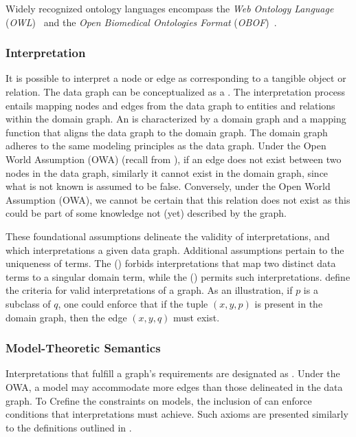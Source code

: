 Widely recognized ontology languages encompass the \textit{Web Ontology Language} (\textit{OWL})~\cite{Hitzler2014OWLPrimer} and the \textit{Open Biomedical Ontologies Format} (\textit{OBOF})~\cite{Mungall2012OBOF}.

\subsubsection{Interpretation}
It is possible to interpret a node or edge as corresponding to a tangible object or relation. The data graph can be conceptualized as a . The interpretation process entails mapping nodes and edges from the data graph to entities and relations within the domain graph. An  is characterized by a domain graph and a mapping function that aligns the data graph to the domain graph. The domain graph adheres to the same modeling principles as the data graph. Under the Open World Assumption (OWA) (recall from ), if an edge does not exist between two nodes in the data graph, similarly it cannot exist in the domain graph, since what is not known is assumed to be false. Conversely, under the Open World Assumption (OWA), we cannot be certain that this relation does not exist as this could be part of some knowledge not (yet) described by the graph. 

These foundational assumptions delineate the validity of interpretations, and which interpretations  a given data graph. Additional assumptions pertain to the uniqueness of terms. The  () forbids interpretations that map two distinct data terms to a singular domain term, while the  () permits such interpretations.
 define the criteria for valid interpretations of a graph. As an illustration, if $p$ is a subclass of $q$, one could enforce that if the tuple $(x,y,p)$ is present in the domain graph, then the edge $(x,y,q)$ must exist.

\subsubsection{Model-Theoretic Semantics}
Interpretations that fulfill a graph's requirements are designated as . Under the OWA, a model may accommodate more edges than those delineated in the data graph. To Crefine the constraints on models, the inclusion of  can enforce conditions that interpretations must achieve. Such axioms are presented similarly to the definitions outlined in .

